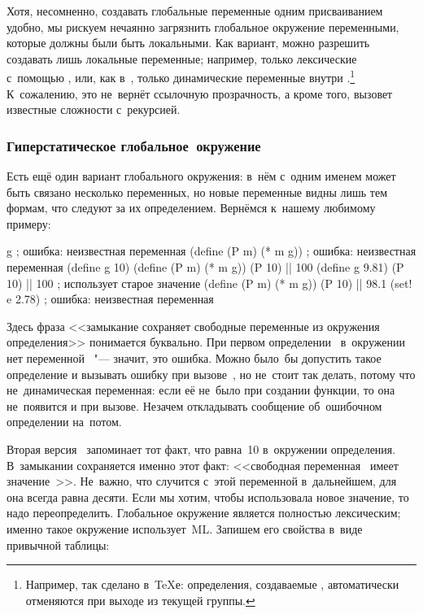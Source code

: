 Хотя, несомненно, создавать глобальные переменные одним присваиванием удобно,
мы рискуем нечаянно загрязнить глобальное окружение переменными, которые должны
были быть локальными. Как вариант, можно разрешить создавать лишь локальные
переменные; например, только лексические с~помощью , или, как
в~\cite{nor72}, только динамические переменные внутри .\footnote*{%
Например, так сделано в~{\TeX}е: определения, создаваемые ,
автоматически отменяются при выходе из текущей группы.} К~сожалению, это
не~вернёт ссылочную прозрачность, а кроме того, вызовет известные сложности
с~рекурсией.


\subsubsection{Гиперстатическое глобальное~окружение}%
\label{assignment/assignment/free-vars/sssect:hyperstatic}

Есть ещё один вариант глобального окружения: в~нём с~одним именем может быть
связано несколько переменных, но новые переменные видны лишь тем формам, что
следуют за их определением. Вернёмся к~нашему любимому примеру:

\begin{code:lisp}
g                      ; ошибка: неизвестная переменная 
(define (P m) (* m g)) ; ошибка: неизвестная переменная 
(define g 10)
(define (P m) (* m g))
(P 10)       |\is| 100
(define g 9.81)        
(P 10)       |\is| 100    ;  использует старое значение 
(define (P m) (* m g))
(P 10)       |\is| 98.1
(set! e 2.78)          ; ошибка: неизвестная переменная 
\end{code:lisp}

Здесь фраза <<замыкание сохраняет свободные переменные из окружения
определения>> понимается буквально. При первом определении~ в~окружении
нет переменной~ "--- значит, это ошибка. Можно было~бы допустить такое
определение и вызывать ошибку при вызове~, но не~стоит так делать, потому
что  не~динамическая переменная: если её не~было при создании функции, то
она не~появится и при вызове. Незачем откладывать сообщение об~ошибочном
определении на~потом.

Вторая версия~ запоминает тот факт, что  равна~10 в~окружении
определения. В~замыкании сохраняется именно этот факт: <<свободная
переменная~ имеет значение~>>. Не~важно, что случится с~этой
переменной в~дальнейшем, для~ она всегда равна десяти. Если мы хотим,
чтобы  использовала новое значение, то  надо переопределить.
Глобальное окружение является полностью лексическим; именно такое
 окружение использует~ML. Запишем его свойства в~виде
привычной таблицы:

